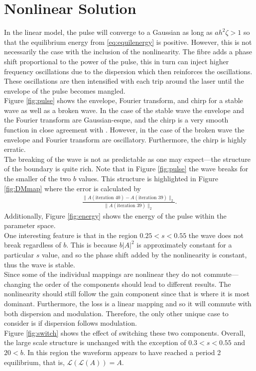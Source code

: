 \chapter{Nonlinear Solution}

In the linear model, the pulse will converge to a Gaussian as long as $a h^2 \zeta > 1$ so that the equilibrium energy from \eqref{eq:equilenergy} is positive. However, this is not necessarily the case with the inclusion of the nonlinearity. The fibre adds a phase shift proportional to the power of the pulse, this in turn can inject higher frequency oscillations due to the dispersion which then reinforces the oscillations. These oscillations are then intensified with each trip around the laser until the envelope of the pulse becomes mangled. \\

Figure \ref{fig:pulse} shows the envelope, Fourier transform, and chirp for a stable wave as well as a broken wave. In the case of the stable wave the envelope and the Fourier transform are Gaussian-esque, and the chirp is a very smooth function in close agreement with \cite{chen}. However, in the case of the broken wave the envelope and Fourier transform are oscillatory. Furthermore, the chirp is highly erratic. \\

The breaking of the wave is not as predictable as one may expect---the structure of the boundary is quite rich. Note that in Figure \ref{fig:pulse} the wave breaks for the smaller of the two $b$ values. This structure is highlighted in Figure \ref{fig:DMmap} where the error is calculated by
\begin{align*}
\frac{\|A(\text{iteration } 40) - A(\text{iteration } 39) \|_2}{\|A(\text{iteration } 39) \|_2}.
\end{align*}
Additionally, Figure \ref{fig:energy} shows the energy of the pulse within the parameter space. \\

One interesting feature is that in the region $0.25 < s < 0.55$ the wave does not break regardless of $b$. This is because $b|A|^2$ is approximately constant for a particular $s$ value, and so the phase shift added by the nonlinearity is constant, thus the wave is stable. \\

Since some of the individual mappings are nonlinear they do not commute---changing the order of the components should lead to different results. The nonlinearity should still follow the gain component since that is where it is most dominant. Furthermore, the loss is a linear mapping and so it will commute with both dispersion and modulation. Therefore, the only other unique case to consider is if dispersion follows modulation. \\

Figure \ref{fig:switch} shows the effect of switching these two components. Overall, the large scale structure is unchanged with the exception of $0.3 < s < 0.55$ and $20 < b$. In this region the waveform appears to have reached a period 2 equilibrium, that is, $\mathcal{L}(\mathcal{L}(A)) = A$.